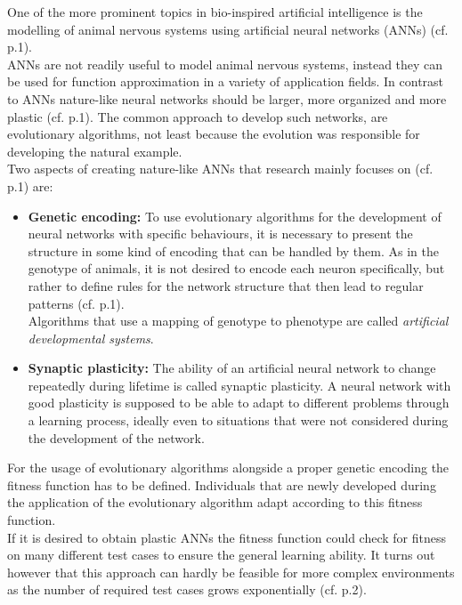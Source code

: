 \documentclass[12pt,twoside]{article}
\theoremstyle{plain}
\theoremstyle{definition}
\theoremstyle{remark}
\begin{document}
One of the more prominent topics in bio-inspired artificial intelligence is the modelling of animal nervous systems using artificial neural networks (ANNs) (cf. \cite{citeulike:12788284} p.1).\\
ANNs are not readily useful to model animal nervous systems, instead they can be used for function approximation in a variety of application fields.
In contrast to ANNs nature-like neural networks should be larger, more organized and more plastic (cf. \cite{citeulike:12788284} p.1). 
The common approach to develop such networks, are evolutionary algorithms, not least because the evolution was responsible for developing the natural example.\\
Two aspects of creating nature-like ANNs that research mainly focuses on (cf. \cite{citeulike:12788284} p.1) are:
\begin{itemize}
	\item \textbf{Genetic encoding:} To use evolutionary algorithms for the development of neural networks with specific behaviours, it is necessary to present the structure in some kind of encoding that can be handled by them.
	As in the genotype of animals, it is not desired to encode each neuron specifically, but rather to define rules for the network structure that then lead to regular patterns (cf. \cite{citeulike:12788284} p.1).\\
	Algorithms that use a mapping of genotype to phenotype are called \textit{artificial developmental systems}.
	\item \textbf{Synaptic plasticity:} The ability of an artificial neural network to change repeatedly during lifetime is called synaptic plasticity.
	A neural network with good plasticity is supposed to be able to adapt to different problems through a learning process, ideally even to situations that were not considered during the development of the network.
\end{itemize}
For the usage of evolutionary algorithms alongside a proper genetic encoding the fitness function has to be defined. Individuals that are newly developed during the application of the evolutionary algorithm adapt according to this fitness function.\\
If it is desired to obtain plastic ANNs the fitness function could check for fitness on many different test cases to ensure the general learning ability.
It turns out however that this approach can hardly be feasible for more complex environments as the number of required test cases grows exponentially (cf. \cite{citeulike:12788284} p.2).\medskip
\end{document}
